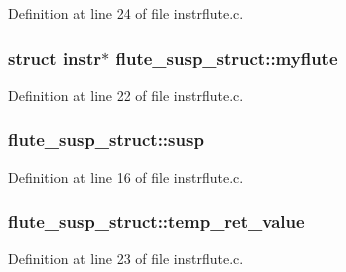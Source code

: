 Definition at line 24 of file instrflute.\+c.

\subsubsection[{\texorpdfstring{myflute}{myflute}}]{\setlength{\rightskip}{0pt plus 5cm}struct {\bf instr}$\ast$ flute\+\_\+susp\+\_\+struct\+::myflute}\hypertarget{structflute__susp__struct_aec4cd288f6f47faf065d16c01da2f9a4}{}\label{structflute__susp__struct_aec4cd288f6f47faf065d16c01da2f9a4}


Definition at line 22 of file instrflute.\+c.

\subsubsection[{\texorpdfstring{susp}{susp}}]{ flute\+\_\+susp\+\_\+struct\+::susp}\hypertarget{structflute__susp__struct_abe3b3b1bb29e8128090892e99fe45d72}{}\label{structflute__susp__struct_abe3b3b1bb29e8128090892e99fe45d72}


Definition at line 16 of file instrflute.\+c.

\subsubsection[{\texorpdfstring{temp\+\_\+ret\+\_\+value}{temp_ret_value}}]{ flute\+\_\+susp\+\_\+struct\+::temp\+\_\+ret\+\_\+value}\hypertarget{structflute__susp__struct_abdc2f77c3717a23a5b57c883c62ee825}{}\label{structflute__susp__struct_abdc2f77c3717a23a5b57c883c62ee825}


Definition at line 23 of file instrflute.\+c.

